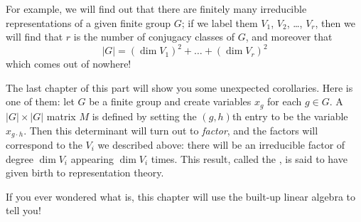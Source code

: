 \begin{itemize}
For example, we will find out that there are finitely
many irreducible representations of a given finite group $G$;
if we label them $V_1$, $V_2$, \dots, $V_r$,
then we will find that $r$ is the number
of conjugacy classes of $G$, and moreover that
\[ |G| = (\dim V_1)^2 + \dots + (\dim V_r)^2 \]
which comes out of nowhere!

The last chapter of this part will show you some
unexpected corollaries.
Here is one of them:
let $G$ be a finite group and create variables $x_g$
for each $g \in G$.
A $|G| \times |G|$ matrix $M$ is defined by setting
the $(g,h)$th entry to be the variable $x_{g \cdot h}$.
Then this determinant will turn out to \emph{factor},
and the factors will correspond to the $V_i$ we described above:
there will be an irreducible factor of degree $\dim V_i$
appearing $\dim V_i$ times.
This result, called the ,
is said to have given birth to representation theory.

If you ever wondered what  is,
this chapter will use the built-up linear algebra to tell you!
\end{itemize}

